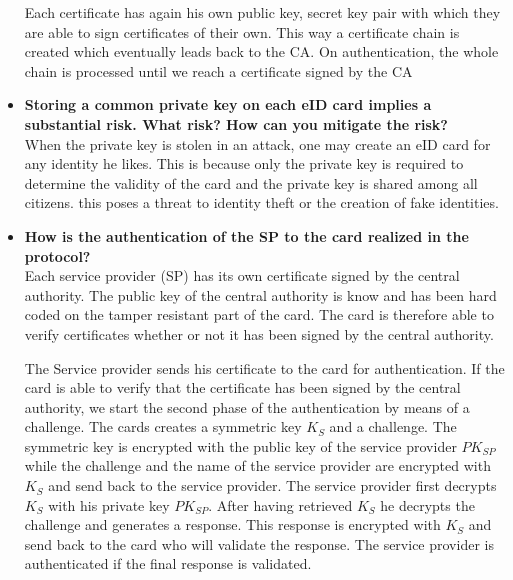 \documentclass[12pt]{report}
\begin{document}
\begin{itemize}
Each certificate has again his own public key, secret key pair with which they are able to sign certificates of their own. This way a certificate chain is created which eventually leads back to the CA. On authentication, the whole chain is processed until we reach a certificate signed by the CA

\item \textbf{Storing a common private key on each eID card implies a substantial risk. What risk? How can you mitigate the risk?}\\
When the private key is stolen in an attack, one may create an eID card for any identity he likes. This is because only the private key is required to determine the validity of the card and the private key is shared among all citizens. this poses a threat to identity theft or the creation of fake identities.

\item \textbf{How is the authentication of the SP to the card realized in the protocol?}\\
Each service provider (SP) has its own certificate signed by the central authority. The public key of the central authority is know and has been hard coded on the tamper resistant part of the card. The card is therefore able to verify certificates whether or not it has been signed by the central authority. 

The Service provider sends his certificate to the card for authentication. If the card is able to verify that the certificate has been signed by the central authority, we start the second phase of the authentication by means of a challenge. The cards creates a symmetric key $K_S$ and a challenge. The symmetric key is encrypted with the public key of the service provider $PK_{SP}$ while the challenge and the name of the service provider are encrypted with $K_S$  and send back to the service provider. The service provider first decrypts $K_S$ with his private key $PK_{SP}$. After having retrieved $K_S$ he decrypts the challenge and generates a response. This response is encrypted with $K_S$ and send back to the card who will validate the response. The service provider is authenticated if the final response is validated.


\end{itemize}
\end{document}
